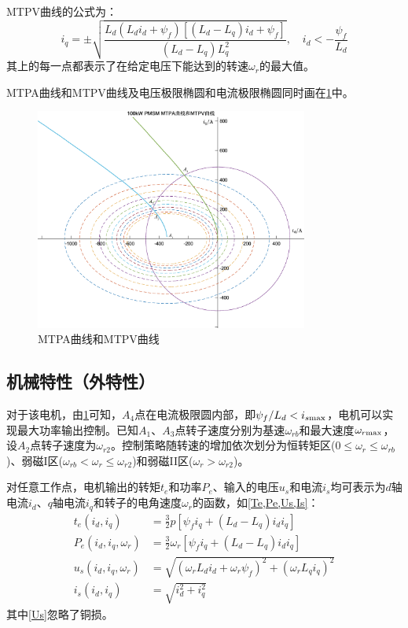 \documentclass[UTF8]{ctexart}
\numberwithin{figure}{section}
\numberwithin{table}{section}
\begin{document}
MTPV曲线的公式\cite{b}为：
\begin{equation}
	i_q=\pm\sqrt{\frac{L_d(L_di_d+\psi_f)[(L_d-L_q)i_d+\psi_f]}{(L_d-L_q)L_q^2}},\quad i_d<-\frac{\psi_f}{L_d}\label{MTPV}
\end{equation}
其上的每一点都表示了在给定电压下能达到的转速$\omega_r$的最大值。

MTPA曲线和MTPV曲线及电压极限椭圆和电流极限椭圆同时画在\cref{MTPA and MTPV}中。

\begin{figure}[htbp]
	\centering
	\includegraphics[width=0.8\textwidth]{4}
	\caption{MTPA曲线和MTPV曲线}
	\label{MTPA and MTPV}
\end{figure}

\subsection{机械特性（外特性）}
\label{subsection:2.6}

对于该电机，由\cref{MTPA and MTPV}可知，$A_4$点在电流极限圆内部，即$\psi_f/L_d<i_{s\rm max}$，电机可以实现最大功率输出控制。已知$A_1$、$A_3$点转子速度分别为基速$\omega_{rb}$和最大速度$\omega_{r\rm max}$，设$A_2$点转子速度为$\omega_{r2}$。控制策略随转速的增加依次划分为恒转矩区($0\le\omega_r\le\omega_{rb}$)、弱磁I区($\omega_{rb}<\omega_r\le\omega_{r2}$)和弱磁II区($\omega_r>\omega_{r2}$)。

对任意工作点，电机输出的转矩$t_e$和功率$P_e$、输入的电压$u_s$和电流$i_s$均可表示为$d$轴电流$i_d$、$q$轴电流$i_q$和转子的电角速度$\omega_r$的函数，如\cref{Te,Pe,Us,Is}\cite{b}：
\begin{align}
	t_e(i_d,i_q)          & =\frac{3}{2}p[\psi_fi_q+(L_d-L_q)i_di_q] \label{Te}                    \\
	P_e(i_d,i_q,\omega_r) & =\frac{3}{2}\omega_r[\psi_fi_q+(L_d-L_q)i_di_q] \label{Pe}             \\
	u_s(i_d,i_q,\omega_r) & =\sqrt{(\omega_rL_di_d+\omega_r\psi_f)^2+(\omega_rL_qi_q)^2}\label{Us} \\
	i_s(i_d,i_q)          & =\sqrt{i_d^2+i_q^2}\label{Is}
\end{align}
其中\cref{Us}忽略了铜损。
\end{document}
